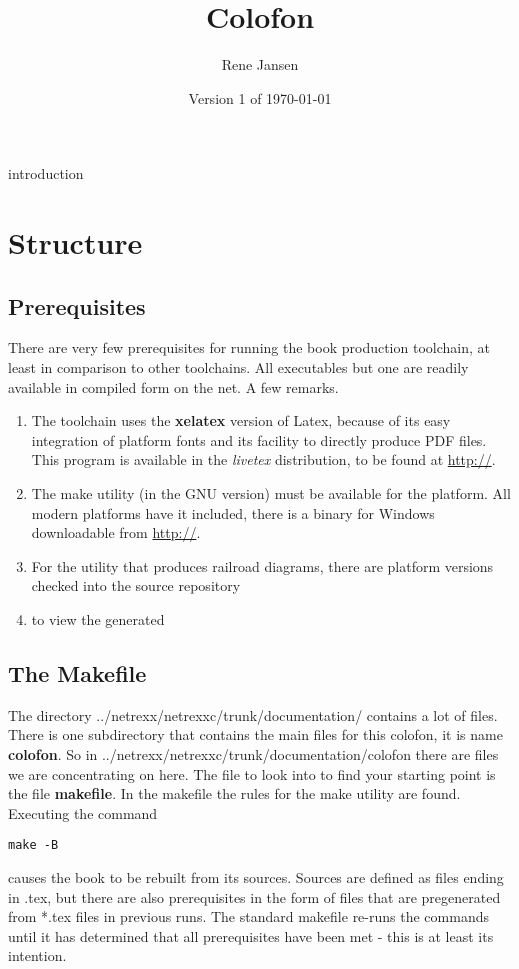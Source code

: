 
    
\renewcommand{\isbn}{978-90-819090-2-0}    
\setcounter{tocdepth}{1} 
\title{Colofon}
\author{Rene Jansen}
\date{Version 1 of \today}
\maketitle
{}
\pagestyle{plain}
\frontmatter
{}
\pagestyle{plain}

\tableofcontents
\newpage
{}
\frontmatter
\large


 {introduction}
\mainmatter
\chapter{Structure}
\section{Prerequisites}
There are very few prerequisites for running the book production
toolchain, at least in comparison to other toolchains. All executables
but one are readily available in compiled form on the net. A few
remarks.
\begin{enumerate}
\item The toolchain uses the \textbf{xelatex} version of Latex, because of
its easy integration of platform fonts and its facility to directly
produce PDF files. This program is available in the \emph{livetex}
distribution, to be found at \url{http://}.
\item The make utility (in the GNU version) must be available for the
  platform. All modern platforms have it included, there is a binary
  for Windows downloadable from \url{http://}.
\item For the utility that produces railroad diagrams, there are
  platform versions checked into the \nr{} source repository
\item to view the generated
\end{enumerate}

\section{The Makefile}
The directory ../netrexx/netrexxc/trunk/documentation/ contains a lot
of files. There is one subdirectory that contains the main files for
this colofon, it is name \textbf{colofon}. So in
../netrexx/netrexxc/trunk/documentation/colofon there are files we are
concentrating on here. The file to look into to find your starting
point is the file \textbf{makefile}. In the makefile the rules for the
make utility are found. Executing the command
\begin{verbatim}
make -B
\end{verbatim}
causes the book to be rebuilt from its sources. Sources are defined as
files ending in .tex, but there are also prerequisites in the form of
files that are pregenerated from *.tex files in previous runs. The
standard makefile re-runs the commands until it has determined that
all prerequisites have been met - this is at least its intention.

